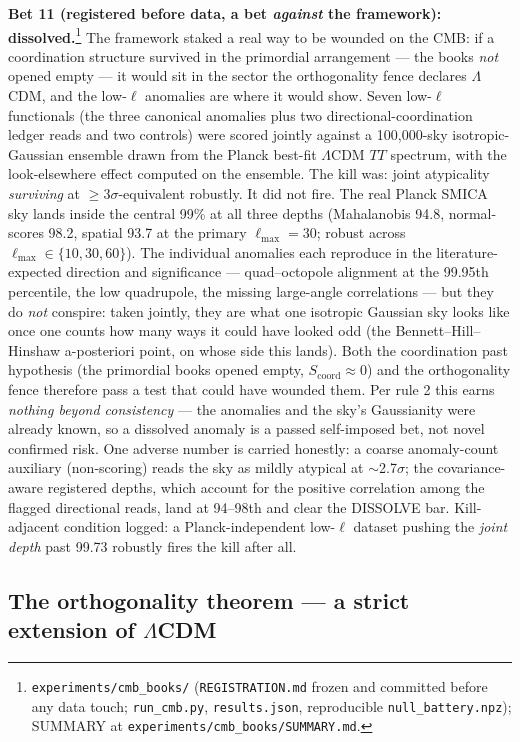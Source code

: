 \documentclass[11pt,a4paper]{article}
\begin{document}
\textbf{Bet 11 (registered before data, a bet \emph{against} the framework): dissolved.}\footnote{\texttt{experiments/cmb\_books/} (\texttt{REGISTRATION.md} frozen and committed before any data touch; \texttt{run\_cmb.py}, \texttt{results.json}, reproducible \texttt{null\_battery.npz}); SUMMARY at \texttt{experiments/cmb\_books/SUMMARY.md}.} The framework staked a real way to be wounded on the CMB: if a coordination structure survived in the primordial arrangement --- the books \emph{not} opened empty --- it would sit in the sector the orthogonality fence declares $\Lambda$CDM, and the low-$\ell$ anomalies are where it would show. Seven low-$\ell$ functionals (the three canonical anomalies plus two directional-coordination ledger reads and two controls) were scored jointly against a 100{,}000-sky isotropic-Gaussian ensemble drawn from the Planck best-fit $\Lambda$CDM $TT$ spectrum, with the look-elsewhere effect computed on the ensemble. The kill was: joint atypicality \emph{surviving} at $\ge 3\sigma$-equivalent robustly. It did not fire. The real Planck SMICA sky lands inside the central 99\% at all three depths (Mahalanobis 94.8, normal-scores 98.2, spatial 93.7 at the primary $\ell_{\max}=30$; robust across $\ell_{\max}\in\{10,30,60\}$). The individual anomalies each reproduce in the literature-expected direction and significance --- quad--octopole alignment at the 99.95th percentile, the low quadrupole, the missing large-angle correlations --- but they do \emph{not} conspire: taken jointly, they are what one isotropic Gaussian sky looks like once one counts how many ways it could have looked odd (the Bennett--Hill--Hinshaw a-posteriori point, on whose side this lands). Both the coordination past hypothesis (the primordial books opened empty, $S_{\text{coord}}\approx 0$) and the orthogonality fence therefore pass a test that could have wounded them. Per rule 2 this earns \emph{nothing beyond consistency} --- the anomalies and the sky's Gaussianity were already known, so a dissolved anomaly is a passed self-imposed bet, not novel confirmed risk. One adverse number is carried honestly: a coarse anomaly-count auxiliary (non-scoring) reads the sky as mildly atypical at $\sim$2.7$\sigma$; the covariance-aware registered depths, which account for the positive correlation among the flagged directional reads, land at 94--98th and clear the DISSOLVE bar. Kill-adjacent condition logged: a Planck-independent low-$\ell$ dataset pushing the \emph{joint depth} past 99.73 robustly fires the kill after all.

\subsection*{The orthogonality theorem --- a strict extension of $\Lambda$CDM}
\end{document}
